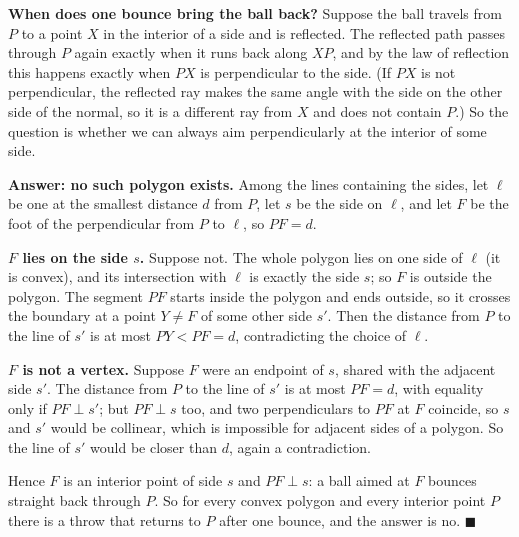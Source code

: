 \textbf{When does one bounce bring the ball back?} Suppose the ball travels from $P$ to a point $X$ in the interior of a side and is reflected. The reflected path passes through $P$ again exactly when it runs back along $XP$, and by the law of reflection this happens exactly when $PX$ is perpendicular to the side. (If $PX$ is not perpendicular, the reflected ray makes the same angle with the side on the other side of the normal, so it is a different ray from $X$ and does not contain $P$.) So the question is whether we can always aim perpendicularly at the interior of some side.

\textbf{Answer: no such polygon exists.} Among the lines containing the sides, let $\ell$ be one at the smallest distance $d$ from $P$, let $s$ be the side on $\ell$, and let $F$ be the foot of the perpendicular from $P$ to $\ell$, so $PF=d$.


\textbf{$F$ lies on the side $s$.} Suppose not. The whole polygon lies on one side of $\ell$ (it is convex), and its intersection with $\ell$ is exactly the side $s$; so $F$ is outside the polygon. The segment $PF$ starts inside the polygon and ends outside, so it crosses the boundary at a point $Y\ne F$ of some other side $s'$. Then the distance from $P$ to the line of $s'$ is at most $PY<PF=d$, contradicting the choice of $\ell$.

\textbf{$F$ is not a vertex.} Suppose $F$ were an endpoint of $s$, shared with the adjacent side $s'$. The distance from $P$ to the line of $s'$ is at most $PF=d$, with equality only if $PF\perp s'$; but $PF\perp s$ too, and two perpendiculars to $PF$ at $F$ coincide, so $s$ and $s'$ would be collinear, which is impossible for adjacent sides of a polygon. So the line of $s'$ would be closer than $d$, again a contradiction.

Hence $F$ is an interior point of side $s$ and $PF\perp s$: a ball aimed at $F$ bounces straight back through $P$. So for every convex polygon and every interior point $P$ there is a throw that returns to $P$ after one bounce, and the answer is $\boxed{\text{no}}$. $\blacksquare$
